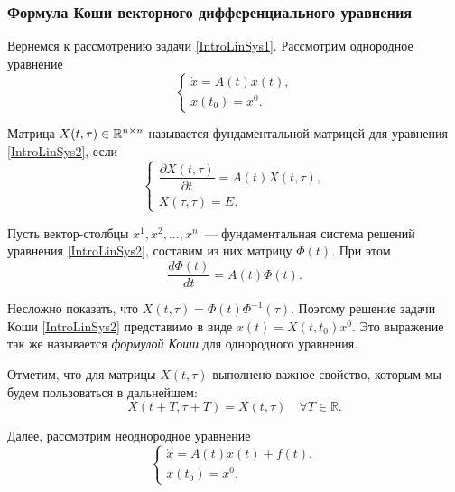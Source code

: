 \subsubsection{Формула Коши векторного дифференциального уравнения}
Вернемся к рассмотрению задачи \eqref{IntroLinSys1}.
Рассмотрим однородное уравнение
\begin{equation}
\label{IntroLinSys2}
  \begin{cases}
    \dot{x} = A(t)x(t),\\
    x(t_{0}) = x^{0}.
  \end{cases}
\end{equation}

\begin{df}
  Матрица $X(t, \tau) \in \mathbb R^{n \times n}$ называется
  фундаментальной матрицей для уравнения \eqref{IntroLinSys2}, если
  \begin{equation*}
    \begin{cases}
      \dfrac{\partial{X}(t, \tau)}{\partial{t}} = A(t)X(t, \tau),\\
      X(\tau,\tau) = E.
    \end{cases}
  \end{equation*}
\end{df}

Пусть вектор-столбцы $x^1, x^2, \ldots, x^n$~--- фундаментальная
система решений уравнения \eqref{IntroLinSys2},
составим из них матрицу $\Phi(t)$.
При этом
\begin{equation*}
  \dfrac{d\Phi(t)}{dt} = A(t)\Phi(t).
\end{equation*}

Несложно показать, что $X(t, \tau) = \Phi(t)\Phi^{-1}(\tau)$.
Поэтому решение задачи Коши \eqref{IntroLinSys2}
представимо в виде $x(t) = X(t, t_{0})x^0$.
Это выражение так же называется
\emph{формулой Коши} для однородного уравнения.

Отметим, что для матрицы $X(t, \tau)$ выполнено
важное свойство, которым мы будем пользоваться
в дальнейшем:
\begin{equation}
\label{IntroInvariant}
  X(t + T, \tau + T) = X(t, \tau) \quad \forall T \in \mathbb{R}.
\end{equation}

Далее, рассмотрим неоднородное уравнение
\begin{equation}
\label{IntroLinSys3}
  \begin{cases}
    \dot{x} = A(t)x(t) + f(t),\\
    x(t_0)= x^0.
  \end{cases}
\end{equation}

